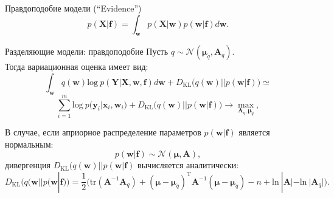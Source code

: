 \documentclass[10pt,pdf,utf8,russian,aspectratio=169]{beamer}
\begin{document}
\begin{frame}{Правдоподобие модели (``Evidence'')}
\[
	p(\mathbf{X}|\mathbf{f}) = \int_\mathbf{w} p(\mathbf{X}|\mathbf{w})p(\mathbf{w}|\mathbf{f}) d\mathbf{w}.
\]


\begin{figure}
  \centering
\label{fig:1}\qquad

\end{figure}


\end{frame}


\begin{frame}{Разделяющие модели: правдоподобие}
Пусть $q \sim \mathcal{N}(\boldsymbol{\mu}_q, \mathbf{A}_q).$\\
Тогда вариационная оценка имеет вид:
$$
\int_{\mathbf{w}} q(\mathbf{w})\text{log}~{p(\mathbf{Y}|\mathbf{X},\mathbf{w},\mathbf{f})} d \mathbf{w} + D_\text{KL}\bigl(q (\mathbf{w} )|| p (\mathbf{w}|\mathbf{f})\bigr) \simeq
$$
$$
\sum_{i=1}^m \text{log}~p(\mathbf{y}_i|\mathbf{x}_i, \mathbf{w}_i) + D_\text{KL}\bigl(q (\mathbf{w} )|| p (\mathbf{w}|\mathbf{f})\bigr) \to \max_{\mathbf{A}_q, \boldsymbol{\mu}_q},
$$

В случае, если априорное распределение параметров $p(\mathbf{w}|\mathbf{f})$ является нормальным: 
$$
p(\mathbf{w}|\mathbf{f}) \sim \mathcal{N}(\boldsymbol{\mu}, \mathbf{A}),
$$
дивергенция $D_\text{KL}\bigl(q (\mathbf{w} )|| p (\mathbf{w}|\mathbf{f})$ вычисляется аналитически:
$$
D_\text{KL}\bigl(q (\mathbf{w} || p (\mathbf{w}|\mathbf{f})\bigr) = \frac{1}{2} \bigl( \text{tr} (\mathbf{A}^{-1}\mathbf{A}_q) + (\boldsymbol{\mu} - \boldsymbol{\mu}_q)^\text{T}\mathbf{A}^{-1}(\boldsymbol{\mu} - \boldsymbol{\mu}_q) - n +\text{ln}~|\mathbf{A}| - \text{ln}~|\mathbf{A}_q| \bigr).
$$
\end{frame}
\end{document}
